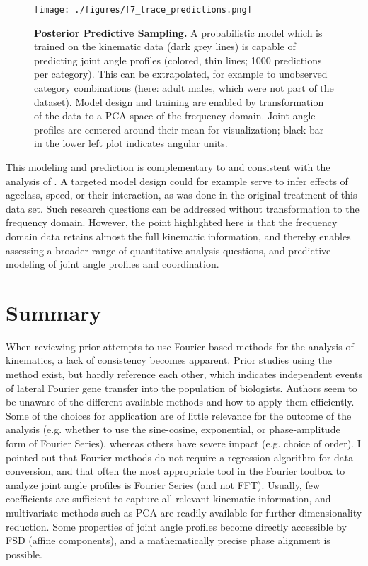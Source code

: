 \begin{figure}[p]
\centering
\texttt{[image: ./figures/f7\_trace\_predictions.png]}
\caption{\label{fig:modelprediction}\textbf{Posterior Predictive Sampling.} A probabilistic model which is trained on the kinematic data (dark grey lines) is capable of predicting joint angle profiles (colored, thin lines; 1000 predictions per category). This can be extrapolated, for example to unobserved category combinations (here: adult males, which were not part of the dataset). Model design and training are enabled by transformation of the data to a PCA-space of the frequency domain. Joint angle profiles are centered around their mean for visualization; black bar in the lower left plot indicates angular units.}
\end{figure}


This modeling and prediction is complementary to and consistent with the analysis of \citet{Druelle2021}.
A targeted model design could for example serve to infer effects of ageclass, speed, or their interaction, as was done in the original treatment of this data set.
Such research questions can be addressed without transformation to the frequency domain.
However, the point highlighted here is that the frequency domain data retains almost the full kinematic information, and thereby enables assessing a broader range of quantitative analysis questions, and predictive modeling of joint angle profiles and coordination.

\FloatBarrier\clearpage
\section{Summary}
\label{summary}
When reviewing prior attempts to use Fourier-based methods for the analysis of kinematics, a lack of consistency becomes apparent.
Prior studies using the method exist, but hardly reference each other, which indicates independent events of lateral Fourier gene transfer into the population of biologists.
Authors seem to be unaware of the different available methods and how to apply them efficiently.
Some of the choices for application are of little relevance for the outcome of the analysis (e.g. whether to use the sine-cosine, exponential, or phase-amplitude form of Fourier Series), whereas others have severe impact (e.g. choice of order).
I pointed out that Fourier methods do not require a regression algorithm for data conversion, and that often the most appropriate tool in the Fourier toolbox to analyze joint angle profiles is Fourier Series (and not FFT).
Usually, few coefficients are sufficient to capture all relevant kinematic information, and multivariate methods such as PCA are readily available for further dimensionality reduction.
Some properties of joint angle profiles become directly accessible by FSD (affine components), and a mathematically precise phase alignment is possible.

